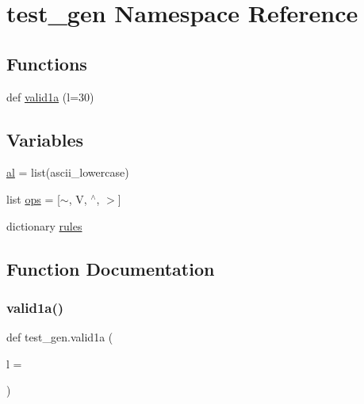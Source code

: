 \hypertarget{namespacetest__gen}{}\section{test\+\_\+gen Namespace Reference}
\label{namespacetest__gen}
\subsection*{Functions}
\begin{DoxyCompactItemize}
\item 
def \mbox{\hyperlink{namespacetest__gen_a9962d8f1ca6e70ba788582016d034643}{valid1a}} (l=30)
\end{DoxyCompactItemize}
\subsection*{Variables}
\begin{DoxyCompactItemize}
\item 
\mbox{\hyperlink{namespacetest__gen_a15007a7e71616c8d31fc5dbda6a402e2}{al}} = list(ascii\+\_\+lowercase)
\item 
list \mbox{\hyperlink{namespacetest__gen_a0bca9f8e7694a8faa3d244db2d477135}{ops}} = \mbox{[}\textquotesingle{}$\sim$\textquotesingle{}, \textquotesingle{}V\textquotesingle{}, \textquotesingle{}$^\wedge$\textquotesingle{}, \textquotesingle{}$>$\textquotesingle{}\mbox{]}
\item 
dictionary \mbox{\hyperlink{namespacetest__gen_a324d3d68dc2188b8721c21c167738008}{rules}}
\end{DoxyCompactItemize}


\subsection{Function Documentation}
\mbox{\label{namespacetest__gen_a9962d8f1ca6e70ba788582016d034643}} 
\subsubsection{\texorpdfstring{valid1a()}{valid1a()}}
{\footnotesize\ttfamily def test\+\_\+gen.\+valid1a (\begin{DoxyParamCaption}\item[{}]{l = {} }\end{DoxyParamCaption})}



